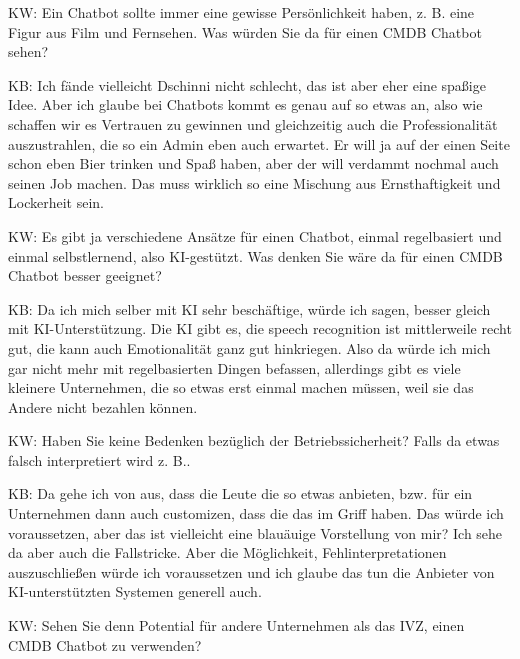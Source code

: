 \begin{list}{X:}{\setlength{\labelsep}{5mm}}
\item[KW:] Ein Chatbot sollte immer eine gewisse Persönlichkeit haben, z. B. eine Figur aus Film und Fernsehen. Was würden Sie da für einen CMDB Chatbot sehen?
\item[KB:] Ich fände vielleicht Dschinni nicht schlecht, das ist aber eher eine spaßige Idee. Aber ich glaube bei Chatbots kommt es genau auf so etwas an, also wie schaffen wir es Vertrauen zu gewinnen und gleichzeitig auch die Professionalität auszustrahlen, die so ein Admin eben auch erwartet. Er will ja auf der einen Seite schon eben Bier trinken und Spaß haben, aber der will verdammt nochmal auch seinen Job machen. Das muss wirklich so eine Mischung aus Ernsthaftigkeit und Lockerheit sein. 
\item[KW:] Es gibt ja verschiedene Ansätze für einen Chatbot, einmal regelbasiert und einmal selbstlernend, also KI-gestützt. Was denken Sie wäre da für einen CMDB Chatbot besser geeignet?
\item[KB:] Da ich mich selber mit KI sehr beschäftige, würde ich sagen, besser gleich mit KI-Unterstützung. Die KI gibt es, die speech recognition ist mittlerweile recht gut, die kann auch Emotionalität ganz gut hinkriegen. Also da würde ich mich gar nicht mehr mit regelbasierten Dingen befassen, allerdings gibt es viele kleinere Unternehmen, die so etwas erst einmal machen müssen, weil sie das Andere nicht bezahlen können.
\item[KW:] Haben Sie keine Bedenken bezüglich der Betriebssicherheit? Falls da etwas falsch interpretiert wird z. B..
\item[KB:] Da gehe ich von aus, dass die Leute die so etwas anbieten, bzw. für ein Unternehmen dann auch customizen, dass die das im Griff haben. Das würde ich voraussetzen, aber das ist vielleicht eine blauäuige Vorstellung von mir? Ich sehe da aber auch die Fallstricke. Aber die Möglichkeit, Fehlinterpretationen auszuschließen würde ich voraussetzen und ich glaube das tun die Anbieter von KI-unterstützten Systemen generell auch. 
\item[KW:] Sehen Sie denn Potential für andere Unternehmen als das IVZ, einen CMDB Chatbot zu verwenden?

\end{list}
